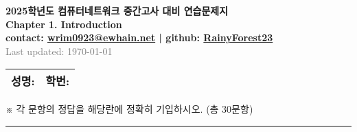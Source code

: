 \documentclass[a4paper, 10pt]{article}
\begin{document}
\begin{center}
  \Large\textbf{2025학년도 컴퓨터네트워크 중간고사 대비 연습문제지}\\[8pt]
  \large\textbf{Chapter 1. Introduction}\\[5pt]
  \small\textbf{contact: \href{mailto:wrim0923@ewhain.net}{wrim0923@ewhain.net} | github: \href{https://github.com/RainyForest23}{RainyForest23}}\\[5pt]
  \small\textcolor{gray}{Last updated: \today}
\end{center}

\vspace{0.5cm}

\begin{tabular}{|m{}|m{}|}
\hline
\textbf{성명:} \hfill & \textbf{학번:} \hfill \\[0.8em]
\hline
\end{tabular}
\vspace{1em}

\noindent
{\small ※ 각 문항의 정답을 해당란에 정확히 기입하시오. (총 30문항)}

\vspace{0.5em}
\noindent\rule{\textwidth}{0.8pt}
\vspace{0.5em}
\end{document}
